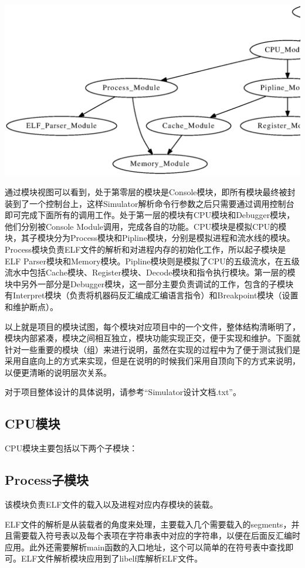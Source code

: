 \documentclass[12pt,a4paper]{article}
\begin{document}
\noindent\includegraphics[width=14cm]{module_view.eps}

通过模块视图可以看到，处于第零层的模块是Console模块，即所有模块最终被封装到了一个控制台上，这样Simulator解析命令行参数之后只需要通过调用控制台即可完成下面所有的调用工作。处于第一层的模块有CPU模块和Debugger模块，他们分别被Console Module调用，完成各自的功能。CPU模块是模拟CPU的模块，其子模块分为Process模块和Pipline模块，分别是模拟进程和流水线的模块。Process模块负责ELF文件的解析和对进程内存的初始化工作，所以起子模块是ELF Parser模块和Memory模块。Pipline模块则是模拟了CPU的五级流水，在五级流水中包括Cache模块、Register模块、Decode模块和指令执行模块。第一层的模块中另外一部分是Debugger模块，这一部分主要负责调试的工作，包含的子模块有Interpret模块（负责将机器码反汇编成汇编语言指令）和Breakpoint模块（设置和维护断点）。

以上就是项目的模块试图，每个模块对应项目中的一个文件，整体结构清晰明了，模块内部紧凑，模块之间相互独立，模块功能实现正交，便于实现和维护。下面就针对一些重要的模块（组）来进行说明，虽然在实现的过程中为了便于测试我们是采用自底向上的方式来实现，但是在说明的时候我们采用自顶向下的方式来说明，以便更清晰的说明层次关系。

对于项目整体设计的具体说明，请参考“Simulator设计文档.txt”。

\subsection{CPU模块}
CPU模块主要包括以下两个子模块：

\subsection{Process子模块}
该模块负责ELF文件的载入以及进程对应内存模块的装载。

ELF文件的解析是从装载者的角度来处理，主要载入几个需要载入的segments，并且需要载入符号表以及每个表项在字符串表中对应的字符串，以便在后面反汇编时应用。此外还需要解析main函数的入口地址，这个可以简单的在符号表中查找即可。ELF文件解析模块应用到了libelf库解析ELF文件。
\end{document}
